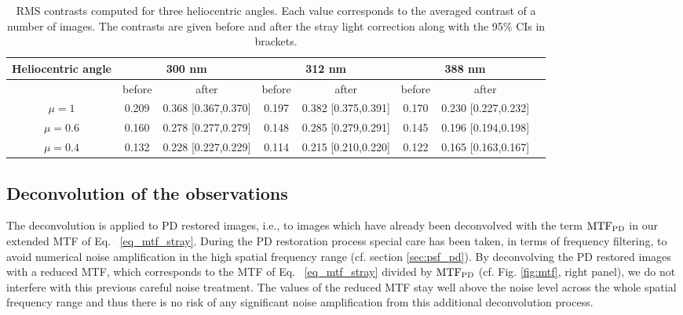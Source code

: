 \documentclass[goettingen, gauss, print]{thesis}
\begin{document}
\begin{table}

\caption{RMS contrasts computed for three heliocentric angles. Each value corresponds to the averaged contrast of a number of images. The contrasts are given before and after the stray light correction along with the 95\% CIs in brackets. } 
\label{tab:RMS_CI}
\centering
 \begin{adjustwidth}{-2cm}{}

\begin{tabular}{cccccccc}

\hline
\hline
Heliocentric angle  & \multicolumn{2}{c}{300 nm}  & \multicolumn{2}{c}{312 nm}  & \multicolumn{2}{c}{388 nm}  \\
\hline
\hline
& before&after &before&after&before&after\\
\hline
 $\mu = 1$ & 0.209& 0.368 [0.367,0.370] & 0.197&0.382 [0.375,0.391] &0.170& 0.230 [0.227,0.232] \\
 $\mu=0.6$&  0.160& 0.278 [0.277,0.279]&0.148&0.285 [0.279,0.291]& 0.145& 0.196 [0.194,0.198]\\
 $\mu=0.4$&  0.132&0.228 [0.227,0.229]&0.114&0.215 [0.210,0.220]&0.122&0.165 [0.163,0.167]\\
 
\hline
\end{tabular}
 \end{adjustwidth}

\end{table}


\subsection{Deconvolution of the observations}
\label{deconv}
The deconvolution is applied to PD restored images, i.e., to images which have already been deconvolved with the term $\mathrm{MTF}_{\mathrm{PD}}$ in our extended MTF of Eq.~ \ref{eq_mtf_stray}. During the PD restoration process special care has been taken, in terms of frequency filtering, to avoid numerical noise amplification in the high spatial frequency range (cf. section \ref{sec:psf_pd}). By deconvolving the PD restored images with a reduced MTF, which corresponds to the MTF of Eq.~ \ref{eq_mtf_stray} divided by $\mathrm{MTF}_{\mathrm{PD}}$ (cf. Fig. \ref{fig:mtf}, right panel), we do not interfere with this previous careful noise treatment. The values of the reduced MTF stay well above the noise level across the whole spatial frequency range and thus there is no risk of any significant noise amplification from this additional deconvolution process.
\end{document}
